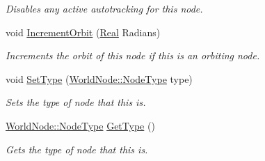 \begin{DoxyCompactItemize}
\begin{DoxyCompactList}\small\item\em Disables any active autotracking for this node. \item\end{DoxyCompactList}\item 
void \hyperlink{classphys_1_1WorldNode_a0849395a47c9cd3182a6a3717b95bcbc}{IncrementOrbit} (\hyperlink{namespacephys_af7eb897198d265b8e868f45240230d5f}{Real} Radians)
\begin{DoxyCompactList}\small\item\em Increments the orbit of this node if this is an orbiting node. \item\end{DoxyCompactList}\item 
void \hyperlink{classphys_1_1WorldNode_abc4cf216177c0a3f4397c83fe3b58e75}{SetType} (\hyperlink{classphys_1_1WorldNode_a0b178b06aa411b00c4c2ccd926d9bf5a}{WorldNode::NodeType} type)
\begin{DoxyCompactList}\small\item\em Sets the type of node that this is. \item\end{DoxyCompactList}\item 
\hyperlink{classphys_1_1WorldNode_a0b178b06aa411b00c4c2ccd926d9bf5a}{WorldNode::NodeType} \hyperlink{classphys_1_1WorldNode_a9688a418ab6871f89845b69f02ab7f9c}{GetType} ()
\begin{DoxyCompactList}\small\item\em Gets the type of node that this is. \item\end{DoxyCompactList}\end{DoxyCompactItemize}
